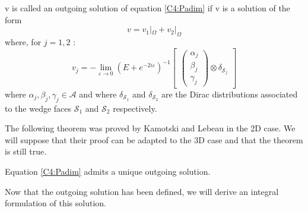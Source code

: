 \begin{definition}
	 v is called an outgoing solution of equation \eqref{C4:Padim} if v is a solution of the form
	\begin{equation}
	\label{C4:decomposition}
	v=v_1|_{\Omega}+v_2|_{\Omega}
	\end{equation}
	where, for $j=1,2$ :
	\begin{equation}
	\label{C4:inv_potentiels}
	v_j=-\lim_{\varepsilon \to 0} (E+e^{-2i\varepsilon})^{-1} \begin{bmatrix}
\begin{pmatrix}
\alpha_j \\
\beta_j \\
\gamma_j
\end{pmatrix}
\otimes \delta_{\mathcal{S}_j}
\end{bmatrix}
	\end{equation}
	where $\alpha_j,\beta_j,\gamma_j \in \mathcal{A}$ and where $\delta_{\mathcal{S}_1}$ and $\delta_{\mathcal{S}_2}$ are the Dirac distributions associated to the wedge faces $\mathcal{S}_1$ and $\mathcal{S}_2$ respectively.
\end{definition}
The following theorem was proved by Kamotski and Lebeau \cite{KamotskiLebeau} in the 2D case. We will suppose that their proof can be adapted to the 3D case and that the theorem is still true.
\begin{theorem}
Equation \eqref{C4:Padim} admits a unique outgoing solution.
\end{theorem}
Now that the outgoing solution has been defined, we will derive an integral formulation of this solution.

